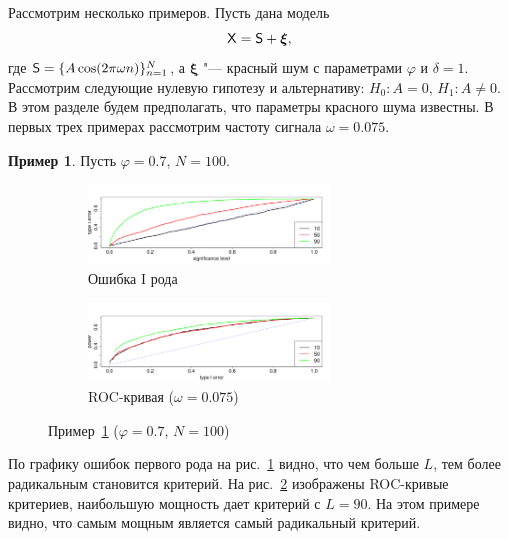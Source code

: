 \documentclass[specialist,
substylefile = spbu_report.rtx,
subf,href,colorlinks=true, 12pt]{disser}
\theoremstyle{definition}
\newtheorem{example}{Пример}
\begin{document}
Рассмотрим несколько примеров. Пусть дана модель
\[
    \mathsf{X}=\mathsf{S}+{\boldsymbol\xi},
\]
где $\mathsf{S}=\{A\cos(2\pi\omega n)\}_{n=1}^N$, а ${\boldsymbol\xi}$ "--- красный шум с параметрами $\varphi$ и $\delta=1$. Рассмотрим следующие нулевую гипотезу и альтернативу: $H_0:A=0$, $H_1:A\ne0$. В этом разделе будем предполагать, что параметры красного шума известны. В первых трех примерах рассмотрим частоту сигнала $\omega = 0.075$.

\begin{example}\label{example1}
	Пусть $\varphi=0.7$, $N=100$.
	\begin{figure}[h!]
		\captionsetup[subfigure]{justification=Centering}
		\begin{subfigure}[t]{\textwidth}
			\centering
			\includegraphics[width=0.7\textwidth]{img/alphaI_phi7_N100}
			\caption{Ошибка I рода}
			\label{alphaI_phi7_N100}
		\end{subfigure}
		\begin{subfigure}[t]{\textwidth}
			\centering
			\includegraphics[width=0.7\textwidth]{img//roc_phi7_N100}
			\caption{ROC-кривая ($\omega=0.075$)}
			\label{roc_phi7_N100}
		\end{subfigure}
	\label{fig:example1}
	\caption{Пример~\ref{example1} ($\varphi=0.7$, $N=100$)}
	\end{figure}
	По графику ошибок первого рода на рис.~\ref{alphaI_phi7_N100} видно, что чем больше $L$, тем более радикальным становится критерий. На рис.~\ref{roc_phi7_N100} изображены ROC-кривые критериев, наибольшую мощность дает критерий с $L=90$. На этом примере видно, что самым мощным является самый радикальный критерий.
\end{example}
\end{document}
